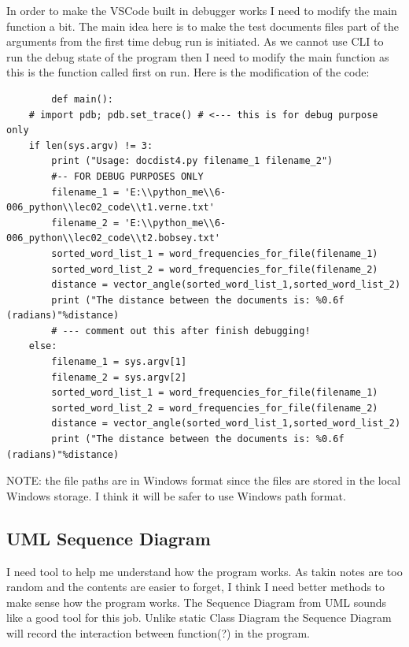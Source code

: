 \documentclass{article}
\begin{document}
    In order to make the VSCode built in debugger works I need to modify the main function a bit. 
    The main idea here is to make the test documents files part of the arguments from the first time debug run is initiated.
    As we cannot use CLI to run the debug state of the program then I need to modify the main function as this is the function called first on run.
    Here is the modification of the code:
    \begin{lstlisting}
        def main():
    # import pdb; pdb.set_trace() # <--- this is for debug purpose only
    if len(sys.argv) != 3:
        print ("Usage: docdist4.py filename_1 filename_2")
        #-- FOR DEBUG PURPOSES ONLY
        filename_1 = 'E:\\python_me\\6-006_python\\lec02_code\\t1.verne.txt'
        filename_2 = 'E:\\python_me\\6-006_python\\lec02_code\\t2.bobsey.txt'
        sorted_word_list_1 = word_frequencies_for_file(filename_1)
        sorted_word_list_2 = word_frequencies_for_file(filename_2)
        distance = vector_angle(sorted_word_list_1,sorted_word_list_2)
        print ("The distance between the documents is: %0.6f (radians)"%distance)
        # --- comment out this after finish debugging!
    else:
        filename_1 = sys.argv[1]
        filename_2 = sys.argv[2]
        sorted_word_list_1 = word_frequencies_for_file(filename_1)
        sorted_word_list_2 = word_frequencies_for_file(filename_2)
        distance = vector_angle(sorted_word_list_1,sorted_word_list_2)
        print ("The distance between the documents is: %0.6f (radians)"%distance)
    \end{lstlisting}
    NOTE: the file paths are in Windows format since the files are stored in the local Windows storage. 
    I think it will be safer to use Windows path format.

    \subsection{UML Sequence Diagram}
    I need tool to help me understand how the program works. 
    As takin notes are too random and the contents are easier to forget, I think I need better methods to make sense how the program works.
    The Sequence Diagram from UML sounds like a good tool for this job. 
    Unlike static Class Diagram the Sequence Diagram will record the interaction between function(?) in the program.
\end{document}
